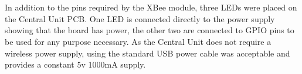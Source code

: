 \\\\

In addition to the pins required by the XBee module, three LEDs were placed on the Central Unit PCB. One LED is connected directly to the power supply showing that the board has power, the other two are connected to GPIO pins to be used for any purpose necessary.
As the Central Unit does not require a wireless power supply, using the standard USB power cable was acceptable and provides a constant 5v 1000mA supply.

